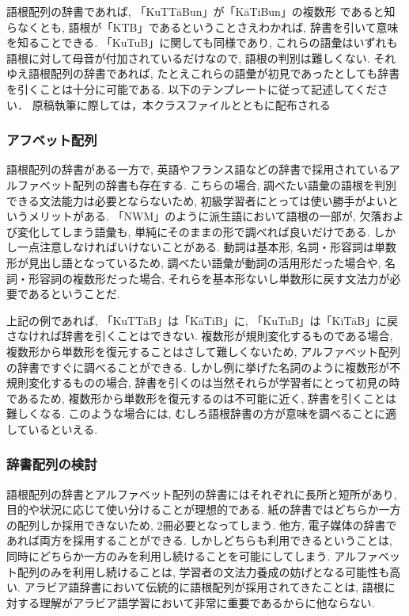 \documentclass[technicalreport]{ieicej}
\begin{document}
語根配列の辞書であれば, 「KuTTāBun」が「KāTiBun」の複数形 であると知らなくとも, 語根が「KTB」であるということさえわかれば, 辞書を引いて意味を知ることできる. 「KuTuB」に関しても同様であり, これらの語彙はいずれも語根に対して母音が付加されているだけなので, 語根の判別は難しくない. それゆえ語根配列の辞書であれば, たとえこれらの語彙が初見であったとしても辞書を引くことは十分に可能である. 
以下のテンプレートに従って記述してください．
原稿執筆に際しては，本クラスファイルとともに配布される

\subsubsection{アフベット配列}
語根配列の辞書がある一方で, 英語やフランス語などの辞書で採用されているアルファベット配列の辞書も存在する. こちらの場合, 調べたい語彙の語根を判別できる文法能力は必要とならないため, 初級学習者にとっては使い勝手がよいというメリットがある. 「NWM」のように派生語において語根の一部が, 欠落および変化してしまう語彙も, 単純にそのままの形で調べれば良いだけである. しかし一点注意しなければいけないことがある. 動詞は基本形, 名詞・形容詞は単数形が見出し語となっているため, 調べたい語彙が動詞の活用形だった場合や, 名詞・形容詞の複数形だった場合, それらを基本形ないし単数形に戻す文法力が必要であるということだ. 

上記の例であれば, 「KuTTāB」は「KāTiB」に, 「KuTuB」は「KiTāB」に戻さなければ辞書を引くことはできない. 複数形が規則変化するものである場合, 複数形から単数形を復元することはさして難しくないため, アルファベット配列の辞書ですぐに調べることができる. しかし例に挙げた名詞のように複数形が不規則変化するものの場合, 辞書を引くのは当然それらが学習者にとって初見の時であるため, 複数形から単数形を復元するのは不可能に近く, 辞書を引くことは難しくなる. このような場合には, むしろ語根辞書の方が意味を調べることに適しているといえる. 

\subsubsection{辞書配列の検討}
語根配列の辞書とアルファベット配列の辞書にはそれぞれに長所と短所があり, 目的や状況に応じて使い分けることが理想的である. 紙の辞書ではどちらか一方の配列しか採用できないため, 2冊必要となってしまう. 他方, 電子媒体の辞書であれば両方を採用することができる. しかしどちらも利用できるということは, 同時にどちらか一方のみを利用し続けることを可能にしてしまう. アルファベット配列のみを利用し続けることは, 学習者の文法力養成の妨げとなる可能性も高い. アラビア語辞書において伝統的に語根配列が採用されてきたことは, 語根に対する理解がアラビア語学習において非常に重要であるからに他ならない. 
\end{document}
